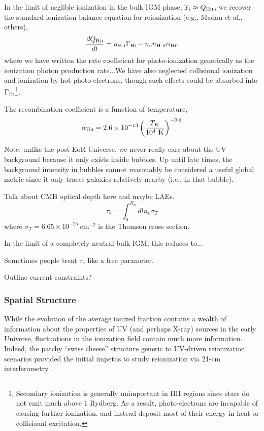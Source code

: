 In the limit of neglible ionization in the bulk IGM phase, $\overline{x}_i \approx Q_{\text{H} {\textsc{ii}}}$, we recover the standard ionization balance equation for reionization (e.g., Madau et al., others),
\begin{equation}
	\frac{d Q_{\text{H} {\textsc{ii}}}}{dt} = n_{\text{H } \textsc{i}} \Gamma_{\text{H} {\textsc{i}}} - n_e n_{\text{H } \textsc{ii}} \alpha_{\text{H} {\textsc{ii}}} \label{eq:ion_balance}
\end{equation}
where we have written the rate coefficient for photo-ionization generically as {\color{red} the ionization photon production rate}...We have also neglected collisional ionization and ionization by hot photo-electrons, though such effects could be absorbed into $\Gamma_{\text{H} {\textsc{i}}}$\footnote{Secondary ionization is generally unimportant in HII regions since stars do not emit much above 1 Rydberg. As a result, photo-electrons are incapable of causing further ionization, and instead deposit most of their energy in heat or collisioanl excitation.}.

The recombination coefficient is a function of temperature,
\begin{equation}
	\alpha_{\text{H} {\textsc{ii}}} = 2.6 \times 10^{-13} \left(\frac{T_K}{10^4 \ \mathrm{K}} \right)^{-0.8}
\end{equation}

Note: unlike the post-EoR Universe, we never really care about the UV background because it only exists inside bubbles. Up until late times, the background intensity in bubbles cannot reasonably be considered a useful global metric since it only traces galaxies relatively nearby (i.e., in that bubble).

Talk about CMB optical depth here and maybe LAEs.
\begin{equation}
	\tau_e = \int_0^{R_{\mathrm{ls}}} dl n_e \sigma_T
\end{equation}
where $\sigma_T = 6.65 \times 10^{-25} \ \mathrm{cm}^{-2}$ is the Thomson cross section.

In the limit of a completely neutral bulk IGM, this reduces to...


Sometimes people treat $\tau_e$ like a free parameter. 

Outline current constraints?


\subsubsection{Spatial Structure} \label{sec:ionization_local}
While the evolution of the average ionized fraction contains a wealth of information about the properties of UV (and perhaps X-ray) sources in the early Universe, fluctuations in the ionization field contain much more information. Indeed, the patchy ``swiss cheese'' structure generic to UV-driven reionization scenarios provided the initial impetus to study reionization via 21-cm interferometry \cite{Madau1997}.

